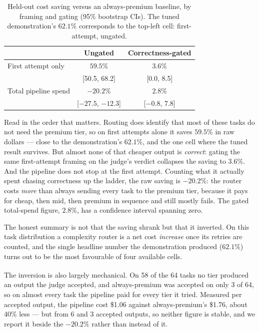 \documentclass[sigconf,review,anonymous]{acmart}
\newcommand{\corr}{\textsuperscript{\dag}}
\begin{document}
\begin{table}[t]
\caption{Held-out cost saving versus an always-premium baseline, by framing and gating (95\% bootstrap CIs).
The tuned demonstration's $62.1\%$ corresponds to the top-left cell: first-attempt, ungated.}
\label{tab:cost}
\small
\begin{tabular}{lcc}
\toprule
& Ungated & Correctness-gated \\
\midrule
First attempt only & $59.5\%$ & $3.6\%$ \\
& \tiny[50.5, 68.2] & \tiny[0.0, 8.5] \\
Total pipeline spend & $\mathbf{-20.2\%}$ & $2.8\%$ \\
& \tiny[$-27.5$, $-12.3$] & \tiny[$-0.8$, 7.8] \\
\bottomrule
\end{tabular}
\end{table}

Read in the order that matters. Routing does identify that most of these tasks do not need the premium
tier, so on first attempts alone it saves $59.5\%$ in raw dollars --- close to the demonstration's
$62.1\%$, and the one cell where the tuned result survives. But almost none of that cheaper output is
\emph{correct}: gating the same first-attempt framing on the judge's verdict collapses the saving to
$3.6\%$. And the pipeline does not stop at the first attempt. Counting what it actually spent chasing
correctness up the ladder, the raw saving is $\mathbf{-20.2\%}$: the router costs \emph{more} than always
sending every task to the premium tier, because it pays for cheap, then mid, then premium in sequence and
still mostly fails. The gated total-spend figure, $2.8\%$, has a confidence interval spanning zero.

The honest summary is not that the saving shrank but that it inverted. On this task distribution a
complexity router is a net cost \emph{increase} once its retries are counted, and the single headline
number the demonstration produced ($62.1\%$) turns out to be the most favourable of four available cells.

The inversion is also largely mechanical\corr{}. On 58 of the 64 tasks no tier produced an output
the judge accepted, and always-premium was accepted on only 3 of 64, so on almost every task the
pipeline paid for every tier it tried. Measured per accepted output, the pipeline cost \$1.06
against always-premium's \$1.76, about 40\% less --- but from 6 and 3 accepted outputs, so neither
figure is stable, and we report it beside the $-20.2\%$ rather than instead of it.
\end{document}
